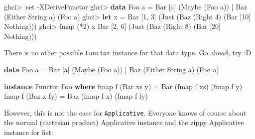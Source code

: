 \documentclass[]{article}
\newenvironment{Shaded}{}{}
\newcommand{\KeywordTok}[1]{\textcolor[rgb]{0.00,0.44,0.13}{\textbf{{#1}}}}
\newcommand{\DataTypeTok}[1]{\textcolor[rgb]{0.56,0.13,0.00}{{#1}}}
\newcommand{\DecValTok}[1]{\textcolor[rgb]{0.25,0.63,0.44}{{#1}}}
\newcommand{\FunctionTok}[1]{\textcolor[rgb]{0.02,0.16,0.49}{{#1}}}
\newcommand{\NormalTok}[1]{{#1}}
\begin{document}
\begin{Shaded}
\begin{Highlighting}[]
\NormalTok{ghci}\FunctionTok{>} \FunctionTok{:}\NormalTok{set }\FunctionTok{-}\DataTypeTok{XDeriveFunctor}
\NormalTok{ghci}\FunctionTok{>} \KeywordTok{data} \DataTypeTok{Foo} \NormalTok{a }\FunctionTok{=} \DataTypeTok{Bar} \NormalTok{[a] (}\DataTypeTok{Maybe} \NormalTok{(}\DataTypeTok{Foo} \NormalTok{a)) }\FunctionTok{|} \DataTypeTok{Baz} \NormalTok{(}\DataTypeTok{Either} \DataTypeTok{String} \NormalTok{a) (}\DataTypeTok{Foo} \NormalTok{a)}
\NormalTok{ghci}\FunctionTok{>} \KeywordTok{let} \NormalTok{x }\FunctionTok{=} \DataTypeTok{Bar} \NormalTok{[}\DecValTok{1}\NormalTok{, }\DecValTok{3}\NormalTok{] (}\DataTypeTok{Just} \NormalTok{(}\DataTypeTok{Baz} \NormalTok{(}\DataTypeTok{Right} \DecValTok{4}\NormalTok{) (}\DataTypeTok{Bar} \NormalTok{[}\DecValTok{10}\NormalTok{] }\DataTypeTok{Nothing}\NormalTok{)))}
\NormalTok{ghci}\FunctionTok{>} \NormalTok{fmap (}\FunctionTok{*}\DecValTok{2}\NormalTok{) x}
\DataTypeTok{Bar} \NormalTok{[}\DecValTok{2}\NormalTok{, }\DecValTok{6}\NormalTok{] (}\DataTypeTok{Just} \NormalTok{(}\DataTypeTok{Baz} \NormalTok{(}\DataTypeTok{Right} \DecValTok{8}\NormalTok{) (}\DataTypeTok{Bar} \NormalTok{[}\DecValTok{20}\NormalTok{] }\DataTypeTok{Nothing}\NormalTok{)))}
\end{Highlighting}
\end{Shaded}

There is no other possible \texttt{Functor} instance for that data type. Go
ahead, try :D

\begin{Shaded}
\begin{Highlighting}[]
\KeywordTok{data} \DataTypeTok{Foo} \NormalTok{a }\FunctionTok{=} \DataTypeTok{Bar} \NormalTok{[a] (}\DataTypeTok{Maybe} \NormalTok{(}\DataTypeTok{Foo} \NormalTok{a)) }\FunctionTok{|} \DataTypeTok{Baz} \NormalTok{(}\DataTypeTok{Either} \DataTypeTok{String} \NormalTok{a) (}\DataTypeTok{Foo} \NormalTok{a)}

\KeywordTok{instance} \DataTypeTok{Functor} \DataTypeTok{Foo} \KeywordTok{where}
    \NormalTok{fmap f (}\DataTypeTok{Bar} \NormalTok{xs y) }\FunctionTok{=} \DataTypeTok{Bar} \NormalTok{(fmap f xs) (fmap f y)}
    \NormalTok{fmap f (}\DataTypeTok{Baz} \NormalTok{x fy) }\FunctionTok{=} \DataTypeTok{Baz} \NormalTok{(fmap f x) (fmap f fy)}
\end{Highlighting}
\end{Shaded}

However, this is not the case for \texttt{Applicative}. Everyone knows of course
about the normal (cartesian product) Applicative instance and the zippy
Applicative instance for list:
\end{document}
